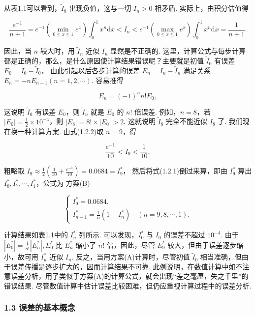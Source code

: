 从表1.1可以看到，\(\tilde{I}_8\) 出现负值，这与一切 \(I_n > 0\) 相矛盾. 实际上，由积分估值得

\[
\frac{e^{-1}}{n+1} = e^{-1}\left(\min_{0 \leqslant x \leqslant 1} e^x\right)\int_0^1 x^n \mathrm{d}x < I_n < e^{-1}\left(\max_{0 \leqslant x \leqslant 1} e^x\right)\int_0^1 x^n \mathrm{d}x = \frac{1}{n+1}. \tag{1.2.2}
\]

因此，当 \(n\) 较大时，用 \(\tilde{I}_n\) 近似 \(I_n\) 显然是不正确的. 这里，计算公式与每步计算都是正确的，那么，是什么原因使计算结果错误呢？主要就是初值 \(\tilde{I}_0\) 有误差 \(E_0 = I_0 - \tilde{I}_0\)， 由此引起以后各步计算的误差 \(E_n = I_n - \tilde{I}_n\) 满足关系 \(E_n = -nE_{n-1}(n=1,2,\cdots)\). 容易推得

\[
E_n = (-1)^n n! E_0,
\]

这说明 \(\tilde{I}_0\) 有误差 \(E_0\)，则 \(\tilde{I}_n\) 就是 \(E_0\) 的 \(n!\) 倍误差. 例如，\(n=8\)，若 \(|E_0| = \frac{1}{2} \times 10^{-4}\)，则 \(|E_8| = 8! \times |E_0| > 2\). 这就说明 \(\tilde{I}_8\) 完全不能近似 \(I_8\) 了. 我们现在换一种计算方案. 由式(1.2.2)取 \(n=9\)，得

\[
\frac{e^{-1}}{10} < I_9 < \frac{1}{10},
\]

粗略取 \(I_9 \approx \frac{1}{2}\left(\frac{1}{10} + \frac{e^{-1}}{10}\right) = 0.0684 = I_9^*\)， 然后将式(1.2.1)倒过来算，即由 \(I_9^*\) 算出 \(I_8^*, I_7^*, \cdots, I_1^*\)，公式为 方案(B)

\[
\begin{cases} I_9^* = 0.0684, \\ I_{n-1}^* = \frac{1}{n}(1 - I_n^*) \quad (n = 9, 8, \cdots, 1). \end{cases}
\]

计算结果如表1.1中的 \(I_n^*\) 列所示. 可以发现，\(I_0^*\) 与 \(I_0\) 的误差不超过 \(10^{-4}\). 由于 \(|E_0^*| = \frac{1}{n!}|E_n^*|, E_0^*\) 比 \(E_n^*\) 缩小了 \(n!\) 倍，因此，尽管 \(E_9^*\) 较大，但由于误差逐步缩小，故可用 \(I_n^*\) 近似 \(I_n\). 反之，当用方案(A)计算时，尽管初值 \(\tilde{I}_0\) 相当准确，但由于误差传播是逐步扩大的，因而计算结果不可靠. 此例说明，在数值计算中如不注意误差分析，用了类似于方案(A)的计算公式，就会出现``差之毫厘，失之千里''的错误结果. 尽管数值计算中估计误差比较困难，但仍应重视计算过程中的误差分析.

\subsubsection{1.3 误差的基本概念}\label{ch01-ux8befux5deeux7684ux57faux672cux6982ux5ff5}


